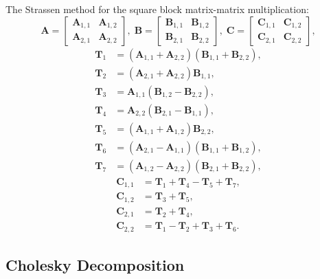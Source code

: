 \documentclass[a4paper,11pt,twoside,openright]{book}
\begin{document}
The Strassen method for the square block matrix-matrix multiplication:
\begin{equation}
  \mathbf{A}=\begin{bmatrix}
    \mathbf{A}_{1,1} & \mathbf{A}_{1,2}\\
    \mathbf{A}_{2,1} & \mathbf{A}_{2,2}
  \end{bmatrix},\;
  \mathbf{B}=\begin{bmatrix}
    \mathbf{B}_{1,1} & \mathbf{B}_{1,2}\\
    \mathbf{B}_{2,1} & \mathbf{B}_{2,2}
  \end{bmatrix},\;
  \mathbf{C}=\begin{bmatrix}
    \mathbf{C}_{1,1} & \mathbf{C}_{1,2}\\
    \mathbf{C}_{2,1} & \mathbf{C}_{2,2}
  \end{bmatrix},
\end{equation}
%
\begin{align}
  \mathbf{T}_{1}&=(\mathbf{A}_{1,1}+\mathbf{A}_{2,2})(\mathbf{B}_{1,1}+\mathbf{B}_{2,2}),\\
  \mathbf{T}_{2}&=(\mathbf{A}_{2,1}+\mathbf{A}_{2,2}) \mathbf{B}_{1,1},\nonumber\\
  \mathbf{T}_{3}&=\mathbf{A}_{1,1}(\mathbf{B}_{1,2}-\mathbf{B}_{2,2}),\nonumber\\
  \mathbf{T}_{4}&=\mathbf{A}_{2,2}(\mathbf{B}_{2,1}-\mathbf{B}_{1,1}),\nonumber\\
  \mathbf{T}_{5}&=(\mathbf{A}_{1,1}+\mathbf{A}_{1,2})\mathbf{B}_{2,2},\nonumber\\
  \mathbf{T}_{6}&=(\mathbf{A}_{2,1}-\mathbf{A}_{1,1})(\mathbf{B}_{1,1}+\mathbf{B}_{1,2}),\nonumber\\
  \mathbf{T}_{7}&=(\mathbf{A}_{1,2}-\mathbf{A}_{2,2})(\mathbf{B}_{2,1}+\mathbf{B}_{2,2}) ,\nonumber
\end{align}
%
\begin{align}
  \mathbf{C}_{1,1}&=\mathbf{T}_{1}+\mathbf{T}_{4}-\mathbf{T}_{5}+\mathbf{T}_{7},\\
  \mathbf{C}_{1,2}&=\mathbf{T}_{3}+\mathbf{T}_{5},\nonumber\\
  \mathbf{C}_{2,1}&=\mathbf{T}_{2}+\mathbf{T}_{4},\nonumber\\
  \mathbf{C}_{2,2}&=\mathbf{T}_{1}-\mathbf{T}_{2}+\mathbf{T}_{3}+\mathbf{T}_{6}.\nonumber
\end{align}

\subsection{Cholesky Decomposition}
\end{document}
